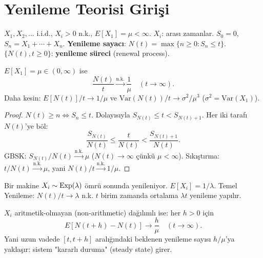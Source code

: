 \section{Yenileme Teorisi Girişi}
\label{sec:yenileme_teorisi}

\begin{tanim}
\label{def:yenileme_sureci}
$X_1, X_2, \ldots$ i.i.d., $X_i > 0$ n.k., $E[X_1] = \mu < \infty$.
$X_i$: arası zamanlar. $S_0 = 0$, $S_n = X_1 + \cdots + X_n$.
\textbf{Yenileme sayacı}: $N(t) = \max\{n \geq 0 : S_n \leq t\}$.
$\{N(t), t \geq 0\}$: \textbf{yenileme süreci} (renewal process).
\end{tanim}

\begin{teorem}
\label{thm:temel_yenileme}
$E[X_1] = \mu \in (0,\infty)$ ise
\[
  \frac{N(t)}{t} \xrightarrow{\text{n.k.}} \frac{1}{\mu} \quad (t \to \infty).
\]
Daha kesin: $E[N(t)]/t \to 1/\mu$ ve $\mathrm{Var}(N(t))/t \to \sigma^2/\mu^3$
($\sigma^2 = \mathrm{Var}(X_1)$).
\end{teorem}

\begin{proof}
$N(t) \geq n \Leftrightarrow S_n \leq t$. Dolayısıyla $S_{N(t)} \leq t < S_{N(t)+1}$.
Her iki tarafı $N(t)$'ye böl:
\[
  \frac{S_{N(t)}}{N(t)} \leq \frac{t}{N(t)} < \frac{S_{N(t)+1}}{N(t)}.
\]
GBSK: $S_{N(t)}/N(t) \xrightarrow{\text{n.k.}} \mu$ ($N(t) \to \infty$ çünkü $\mu < \infty$).
Sıkıştırma: $t/N(t) \xrightarrow{\text{n.k.}} \mu$, yani $N(t)/t \xrightarrow{\text{n.k.}} 1/\mu$.
\end{proof}

\begin{ornek}
Bir makine $X_i \sim \operatorname{Exp}(\lambda)$ ömrü sonunda yenileniyor.
$E[X_i] = 1/\lambda$. Temel Yenileme: $N(t)/t \to \lambda$ n.k.
$t$ birim zamanda ortalama $\lambda t$ yenileme yapılır.
\end{ornek}

\begin{teorem}
\label{thm:blackwell}
$X_i$ aritmetik-olmayan (non-arithmetic) dağılımlı ise: her $h > 0$ için
\[
  E[N(t+h) - N(t)] \to \frac{h}{\mu} \quad (t \to \infty).
\]
Yani uzun vadede $[t, t+h]$ aralığındaki beklenen yenileme sayısı $h/\mu$'ya yaklaşır:
sistem "kararlı duruma" (steady state) girer.
\end{teorem}


